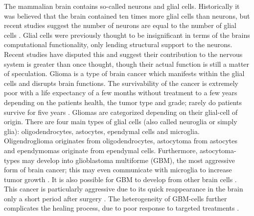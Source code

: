 The mammalian brain contains so-called neurons and glial cells. Historically it was believed that the brain contained ten times more glial cells than neurons, but recent studies suggest the number of neurons are equal to the number of glial cells \cite{von2016search}. Glial cells were previously thought to be insignificant in terms of the brains computational functionality, only lending structural support to the neurons. Recent studies have disputed this and suggest their contribution to the nervous system is greater than once thought, though their actual function is still a matter of speculation. Glioma is a type of brain cancer which manifests within the glial cells and disrupts brain functions. The survivability of the cancer is extremely poor with a life expectancy of a few months without treatment to a few years depending on the patients health, the tumor type and grade; rarely do patients survive for five years \cite{glialcells, gallego2015nonsurgical, bleeker2012recent}. Gliomas are categorized depending on their glial-cell of origin. There are four main types of glial cells (also called neuroglia or simply glia): oligodendrocytes, astocytes, ependymal cells and microglia. Oligendroglioma originates from oligodendrocytes, astocytoma from astocytes and ependymomas originate from ependymal cells. Furthermore, astocytoma-types may develop into glioblastoma multiforme (GBM), the most aggressive form of brain cancer; this may even communicate with  microglia to increase tumor growth \cite{maas2020glioblastoma}. It is also possible for GBM to develop from other brain cells \cite{glialcells}. This cancer is particularly aggressive due to its quick reappearance in the brain only a short period after surgery \cite{gallego2015nonsurgical}. The heterogeneity of GBM-cells further complicates the healing process, due to poor response to targeted treatments \cite{dirkse2019stem}.


